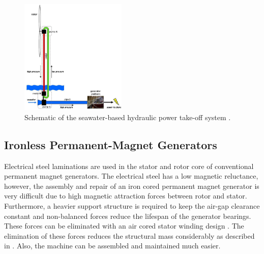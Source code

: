 \documentclass[a4paper, 11pt]{article} %
\begin{document}
  \begin{figure}[]
    \centering
    \includegraphics[width=0.45\textwidth]{we-at-sea}
    \caption{Schematic of the seawater-based hydraulic power take-off system  \cite{Diepeveen2004}.} 
    \label{we-at-sea}
  \end{figure}

\subsection{Ironless Permanent-Magnet Generators}

Electrical steel laminations are used in the stator and rotor core of conventional permanent magnet generators. The electrical steel has a low magnetic reluctance, however, the assembly and repair of an iron cored permanent magnet generator is very difficult due to high magnetic attraction forces between rotor and stator. Furthermore, a heavier support structure is required to keep the air-gap clearance constant and non-balanced forces reduce the lifespan of the generator bearings. These forces can be eliminated with an air cored stator winding design \cite{Mueller2009}. The elimination of these forces reduces the structural mass considerably as described in \cite{McDonald2008b}. Also, the machine can be assembled and maintained much easier. 
\end{document}
